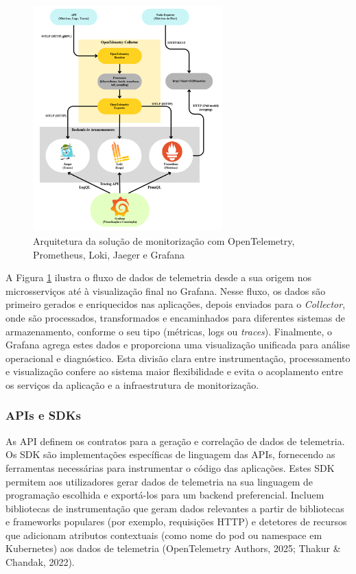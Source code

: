 \begin{figure}[H]
    \centering
    \includegraphics[width=0.65\textwidth]{images/Diagramas/arquitetura_da_solucao.png}
    \caption{Arquitetura da solução de monitorização com OpenTelemetry, Prometheus, Loki, Jaeger e Grafana}
    \label{fig:otel_arch}
\end{figure}

A Figura \ref{fig:otel_arch} ilustra o fluxo de dados de telemetria desde a sua origem nos microsserviços até à visualização final no Grafana. Nesse fluxo, os dados são primeiro gerados e enriquecidos nas aplicações, depois enviados para o \textit{Collector}, onde são processados, transformados e encaminhados para diferentes sistemas de armazenamento, conforme o seu tipo (métricas, logs ou \textit{traces}). Finalmente, o Grafana agrega estes dados e proporciona uma visualização unificada para análise operacional e diagnóstico. Esta divisão clara entre instrumentação, processamento e visualização confere ao sistema maior flexibilidade e evita o acoplamento entre os serviços da aplicação e a infraestrutura de monitorização.

\subsubsection{APIs e SDKs}
As API definem os contratos para a geração e correlação de dados de telemetria. Os SDK são implementações específicas de linguagem das APIs, fornecendo as ferramentas necessárias para instrumentar o código das aplicações. Estes SDK permitem aos utilizadores gerar dados de telemetria na sua linguagem de programação escolhida e exportá-los para um backend preferencial. Incluem bibliotecas de instrumentação que geram dados relevantes a partir de bibliotecas e frameworks populares (por exemplo, requisições HTTP) e detetores de recursos que adicionam atributos contextuais (como nome do pod ou namespace em Kubernetes) aos dados de telemetria (OpenTelemetry Authors, 2025; Thakur \& Chandak, 2022).

